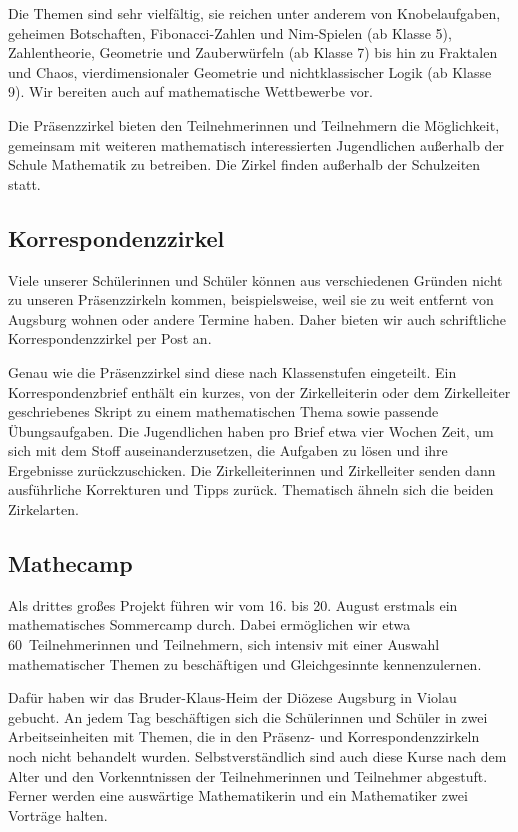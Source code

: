 \documentclass[12pt]{zettel}
\begin{document}
Die Themen sind sehr vielfältig, sie reichen unter anderem von
Knobelaufgaben, geheimen Botschaften, Fibonacci-Zahlen und Nim-Spielen (ab Klasse 5),
Zahlentheorie, Geometrie und Zauberwürfeln (ab Klasse 7) bis hin zu
Fraktalen und Chaos, vierdimensionaler Geometrie und nichtklassischer Logik
(ab Klasse 9). Wir bereiten auch auf mathematische Wettbewerbe vor. 

Die Präsenzzirkel bieten den Teilnehmerinnen und Teilnehmern die Möglichkeit,
gemeinsam mit weiteren mathematisch interessierten Jugendlichen außerhalb der
Schule Mathematik zu betreiben. Die Zirkel finden außerhalb der Schulzeiten
statt.


\subsection{Korrespondenzzirkel}

Viele unserer Schülerinnen und Schüler können aus verschiedenen Gründen
nicht zu unseren Präsenzzirkeln kommen, beispielsweise, weil sie zu weit
entfernt von Augsburg wohnen oder andere Termine haben.
Daher bieten wir auch schriftliche Korrespondenzzirkel per Post
an.

Genau wie die Präsenzzirkel sind diese nach Klassenstufen eingeteilt. Ein
Korrespondenzbrief enthält ein kurzes, von der Zirkelleiterin oder dem
Zirkelleiter geschriebenes Skript zu einem mathematischen Thema sowie passende
Übungsaufgaben. Die Jugendlichen haben pro Brief etwa vier Wochen Zeit, um sich
mit dem Stoff auseinanderzusetzen, die Aufgaben zu lösen und ihre Ergebnisse
zurückzuschicken. Die Zirkelleiterinnen und Zirkelleiter senden dann
ausführliche Korrekturen und Tipps zurück.
Thematisch ähneln sich die beiden Zirkelarten.


\subsection{Mathecamp}

Als drittes großes Projekt führen wir vom 16. bis 20. August erstmals ein
mathematisches Sommercamp durch. Dabei ermöglichen wir etwa 60~Teilnehmerinnen
und Teilnehmern, sich intensiv mit einer Auswahl mathematischer Themen zu
beschäftigen und Gleichgesinnte kennenzulernen.

Dafür haben wir das Bruder-Klaus-Heim der Diözese Augsburg in Violau
gebucht. An jedem Tag beschäftigen sich die Schülerinnen und Schüler in zwei
Arbeitseinheiten mit Themen, die in den Präsenz- und Korrespondenzzirkeln noch
nicht behandelt wurden. Selbstverständlich sind auch diese Kurse nach dem Alter
und den Vorkenntnissen der Teilnehmerinnen und Teilnehmer abgestuft. Ferner
werden eine auswärtige Mathematikerin und ein Mathematiker zwei Vorträge halten.
\end{document}
